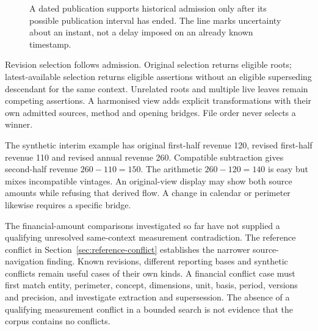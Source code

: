 \begin{figure}[htbp]
\centering
{}
\caption{A dated publication supports historical admission only after its
possible publication interval has ended. The line marks uncertainty about an
instant, not a delay imposed on an already known timestamp.}
\end{figure}

Revision selection follows admission. Original selection returns eligible
roots; latest-available selection returns eligible assertions without an
eligible superseding descendant for the same context. Unrelated roots and
multiple live leaves remain competing assertions. A harmonised view adds
explicit transformations with their own admitted sources, method and opening
bridges. File order never selects a winner.

The synthetic interim example has original first-half revenue 120, revised
first-half revenue 110 and revised annual revenue 260. Compatible subtraction
gives second-half revenue $260-110=150$. The arithmetic $260-120=140$ is easy
but mixes incompatible vintages. An original-view display may show both source
amounts while refusing that derived flow. A change in calendar or perimeter
likewise requires a specific bridge.

The financial-amount comparisons investigated so far have not supplied a
qualifying unresolved same-context measurement contradiction. The reference
conflict in Section~\ref{sec:reference-conflict} establishes the narrower
source-navigation finding. Known revisions, different reporting bases and
synthetic conflicts remain useful cases of their own kinds. A financial
conflict case must first match entity, perimeter, concept, dimensions, unit,
basis, period, versions and precision, and investigate extraction and
supersession. The absence of a qualifying measurement conflict in a bounded
search is not evidence that the corpus contains no conflicts.
